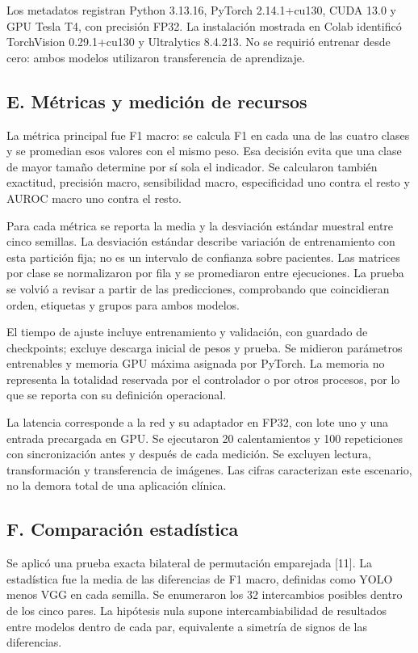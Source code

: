 \documentclass[conference]{IEEEtran}
\begin{document}
Los metadatos registran Python 3.13.16, PyTorch 2.14.1+cu130, CUDA 13.0 y GPU Tesla T4, con precisión FP32. La instalación mostrada en Colab identificó TorchVision 0.29.1+cu130 y Ultralytics 8.4.213. No se requirió entrenar desde cero: ambos modelos utilizaron transferencia de aprendizaje.

\newpage
\subsection*{E. Métricas y medición de recursos}
La métrica principal fue F1 macro: se calcula F1 en cada una de las cuatro clases y se promedian esos valores con el mismo peso. Esa decisión evita que una clase de mayor tamaño determine por sí sola el indicador. Se calcularon también exactitud, precisión macro, sensibilidad macro, especificidad uno contra el resto y AUROC macro uno contra el resto.

Para cada métrica se reporta la media y la desviación estándar muestral entre cinco semillas. La desviación estándar describe variación de entrenamiento con esta partición fija; no es un intervalo de confianza sobre pacientes. Las matrices por clase se normalizaron por fila y se promediaron entre ejecuciones. La prueba se volvió a revisar a partir de las predicciones, comprobando que coincidieran orden, etiquetas y grupos para ambos modelos.

El tiempo de ajuste incluye entrenamiento y validación, con guardado de checkpoints; excluye descarga inicial de pesos y prueba. Se midieron parámetros entrenables y memoria GPU máxima asignada por PyTorch. La memoria no representa la totalidad reservada por el controlador o por otros procesos, por lo que se reporta con su definición operacional.

La latencia corresponde a la red y su adaptador en FP32, con lote uno y una entrada precargada en GPU. Se ejecutaron 20 calentamientos y 100 repeticiones con sincronización antes y después de cada medición. Se excluyen lectura, transformación y transferencia de imágenes. Las cifras caracterizan este escenario, no la demora total de una aplicación clínica.

\subsection*{F. Comparación estadística}
Se aplicó una prueba exacta bilateral de permutación emparejada [11]. La estadística fue la media de las diferencias de F1 macro, definidas como YOLO menos VGG en cada semilla. Se enumeraron los 32 intercambios posibles dentro de los cinco pares. La hipótesis nula supone intercambiabilidad de resultados entre modelos dentro de cada par, equivalente a simetría de signos de las diferencias.
\end{document}
